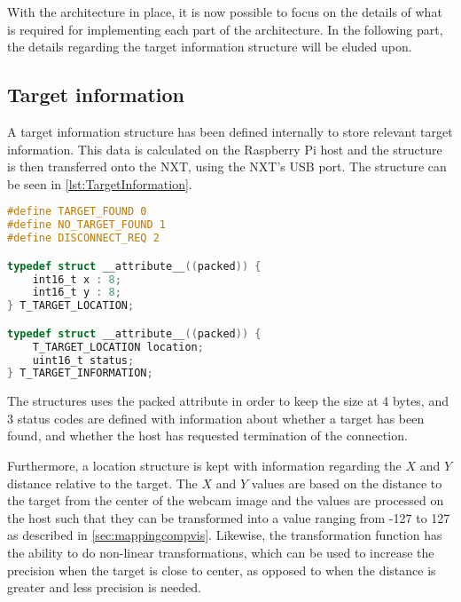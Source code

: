 With the architecture in place, it is now possible to focus on the details of what is required for implementing each part of the architecture.
In the following part, the details regarding the target information structure will be eluded upon.

\subsection{Target information}
A target information structure has been defined internally to store relevant target information.
This data is calculated on the Raspberry Pi host and the structure is then transferred onto the NXT, using the NXT's USB port.
The structure can be seen in \autoref{lst:TargetInformation}.
\begin{lstlisting}[language=C, label={lst:TargetInformation},caption={Target information structure from target\_location.h}]
#define TARGET_FOUND 0
#define NO_TARGET_FOUND 1
#define DISCONNECT_REQ 2

typedef struct __attribute__((packed)) {
	int16_t x : 8;
	int16_t y : 8;
} T_TARGET_LOCATION;

typedef struct __attribute__((packed)) {
	T_TARGET_LOCATION location;
	uint16_t status;
} T_TARGET_INFORMATION;
\end{lstlisting}

The structures uses the packed attribute in order to keep the size at 4 bytes, and 3 status codes are defined with information about whether a target has been found, and whether the host has requested termination of the connection.

Furthermore, a location structure is kept with information regarding the $X$ and $Y$ distance relative to the target.
The $X$ and $Y$ values are based on the distance to the target from the center of the webcam image and the values are processed on the host such that they can be transformed into a value ranging from -127 to 127 as described in \autoref{sec:mappingcompvis}.
Likewise, the transformation function has the ability to do non-linear transformations, which can be used to increase the precision when the target is close to center, as opposed to when the distance is greater and less precision is needed.
